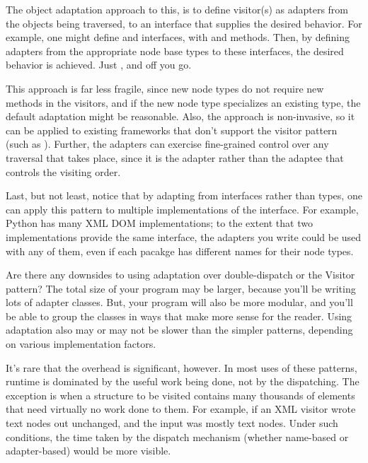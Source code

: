\begin{verbatim%
}
\begin{verbatim%
}
\begin{verbatim%
}
\begin{verbatim%
}
\begin{verbatim%
}
\begin{verbatim%
}
\begin{verbatim%
}
\begin{verbatim%
}
\begin{verbatim%
}
\begin{verbatim%
}
\begin{verbatim%
}
\begin{verbatim%
}
\begin{verbatim%
}
\begin{verbatim%
}
The object adaptation approach to this, is to define visitor(s) as adapters from
the objects being traversed, to an interface that supplies the desired behavior.
For example, one might define  and 
interfaces, with  and  methods.  Then, by
defining adapters from the appropriate node base types to these interfaces, the
desired behavior is achieved.  Just
, and off you go.

This approach is far less fragile, since new node types do not require new
methods in the visitors, and if the new node type specializes an existing type,
the default adaptation might be reasonable.  Also, the approach is non-invasive,
so it can be applied to existing frameworks that don't support the visitor
pattern (such as ).  Further, the adapters can exercise
fine-grained control over any traversal that takes place, since it is the
adapter rather than the adaptee that controls the visiting order.





Last, but not least, notice that by adapting from interfaces rather than
types, one can apply this pattern to multiple implementations of the interface.
For example, Python has many XML DOM implementations; to the extent that two
implementations provide the same interface, the adapters you write could be used
with any of them, even if each pacakge has different names for their node types.

Are there any downsides to using adaptation over double-dispatch or the Visitor
pattern?  The total size of your program may be larger, because you'll be
writing lots of adapter classes.  But, your program will also be more modular,
and you'll be able to group the classes in ways that make more sense for the
reader.  Using adaptation also may or may not be slower than the simpler
patterns, depending on various implementation factors.

It's rare that the overhead is significant, however.  In most uses of these
patterns, runtime is dominated by the useful work being done, not by the
dispatching.  The exception is when a structure to be visited contains many
thousands of elements that need virtually no work done to them.  For example,
if an XML visitor wrote text nodes out unchanged, and the input was mostly text
nodes.  Under such conditions, the time taken by the dispatch mechanism (whether
name-based or adapter-based) would be more visible.


\end{verbatim%
}
\end{verbatim%
}
\end{verbatim%
}
\end{verbatim%
}
\end{verbatim%
}
\end{verbatim%
}
\end{verbatim%
}
\end{verbatim%
}
\end{verbatim%
}
\end{verbatim%
}
\end{verbatim%
}
\end{verbatim%
}
\end{verbatim%
}
\end{verbatim%
}
